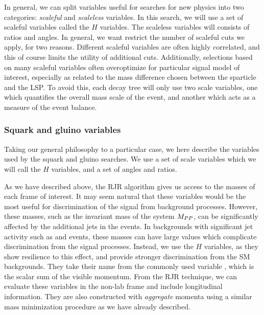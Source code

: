 In general, we can split variables useful for searches for new physics into two categories: \textit{scaleful} and \textit{scaleless} variables.
In this search, we will use a set of scaleful variables called the $H$ variables.
The scaleless variables will consists of ratios and angles.
In general, we want restrict the number of scaleful cuts we apply, for two reasons.
Different scaleful variables are often highly correlated, and this of course limits the utility of additional cuts.
Additionally, selections based on many scaleful variables often overoptimize for particular signal model of interest, especially as related to the mass difference chosen between the sparticle and the LSP.
To avoid this, each decay tree will only use two scale variables, one which quantifies the overall mass scale of the event, and another which acts as a measure of the event balance.

\subsubsection{Squark and gluino variables}

Taking our general philosophy to a particular case, we here describe the variables used by the squark and gluino searches.
We use a set of scale variables which we will call the $H$ variables, and a set of angles and ratios.

As we have described above, the RJR algorithm gives us access to the masses of each frame of interest.
It may seem natural that these variables would be the most useful for discrimination of the signal from background processes.
However, these masses, such as the invariant mass of the \PP system $M_{PP }$, can be significantly affected by the additional jets in the events.
In backgrounds with significant jet activity such as \zjets and \wjets events, these masses can have large values which complicate discrimination from the signal processes.
Instead, we use the $H$ variables, as they show resilience to this effect, and provide stronger discrimination from the SM backgrounds.
They take their name from the commonly used variable \HT, which is the scalar sum of the visible momentum.
From the RJR technique, we can evaluate these variables in the non-lab frame and include longitudinal information.
They are also constructed with \textit{aggregate} momenta using a similar mass minimization procedure as we have already described.

